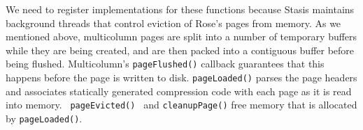 \documentclass{vldb}
\newcommand{\rows}{Rose\xspace}
\newcommand{\rowss}{Rose's\xspace}
\begin{document}




We need to register implementations for these functions because
Stasis maintains background threads that control eviction
of \rowss pages from memory.  As we mentioned above, multicolumn pages
are split into a number of temporary buffers while they are being
created, and are then packed into a contiguous buffer before being
flushed.  Multicolumn's {\tt pageFlushed()} callback guarantees that
this happens before the page is written to disk.  {\tt pageLoaded()}
parses the page headers and associates statically generated
compression code with each page as it is read into memory.  {\tt
  pageEvicted() } and {\tt cleanupPage()} free memory that is
allocated by {\tt pageLoaded()}.


\end{document}
